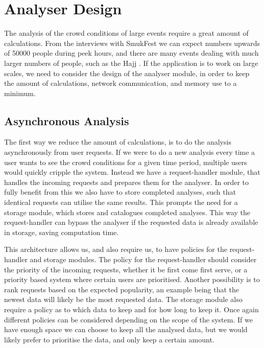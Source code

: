 \section{Analyser Design}\label{s3:analyser_design}

The analysis of the crowd conditions of large events require a great amount of calculations. From the interviews with SmukFest we can expect numbers upwards of 50000 people during peek hours, and there are many events dealing with much larger numbers of people, such as the Hajj \cite{website:Wikipedia-Hajj2}. If the application is to work on large scales, we need to consider the design of the analyser module, in order to keep the amount of calculations, network communication, and memory use to a minimum.

\subsection{Asynchronous Analysis}

The first way we reduce the amount of calculations, is to do the analysis asynchronously from user requests. If we were to do a new analysis every time a user wants to see the crowd conditions for a given time period, multiple users would quickly cripple the system. Instead we have a request-handler module, that handles the incoming requests and prepares them for the analyser. In order to fully benefit from this we also have to store completed analyses, such that identical requests can utilise the same results. This prompts the need for a storage module, which stores and catalogues completed analyses. This way the request-handler can bypass the analyser if the requested data is already available in storage, saving computation time.

This architecture allows us, and also require us, to have policies for the request-handler and storage modules. The policy for the request-handler should consider the priority of the incoming requests, whether it be first come first serve, or a priority based system where certain users are prioritised. Another possibility is to rank requests based on the expected popularity, an example being that the newest data will likely be the most requested data. The storage module also require a policy as to which data to keep and for how long to keep it. Once again different policies can be considered depending on the scope of the system. If we have enough space we can choose to keep all the analysed data, but we would likely prefer to prioritise the data, and only keep a certain amount.

